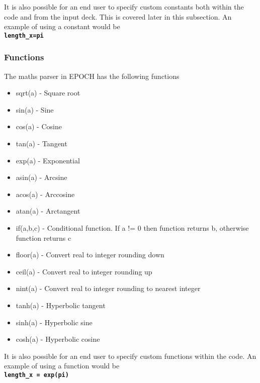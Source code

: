 \documentclass[12pt]{article}
\newcommand{\inlinecode}[1]{{\color{warwickred} \bf\texttt{#1}}}
\newcommand{\EPOCH}{{\color{warwickdark}\fontfamily{phv}\selectfont EPOCH} }
\begin{document}
It is also possible for an end user to specify custom constants both within
the code and from the input deck. This is covered later in this subsection. An
example of using a constant would be\\
\inlinecode{length\_x=pi}\\

\subsubsection{Functions}
The maths parser in \EPOCH has the following functions
\begin{itemize}
\item sqrt(a) - Square root
\item sin(a) - Sine
\item cos(a) - Cosine
\item tan(a) - Tangent
\item exp(a) - Exponential
\item asin(a) - Arcsine
\item acos(a) - Arccosine
\item atan(a) - Arctangent
\item if(a,b,c) - Conditional function. If a != 0 then function returns b,
  otherwise function returns c
\item floor(a) - Convert real to integer rounding down
\item ceil(a) - Convert real to integer rounding up
\item nint(a) - Convert real to integer rounding to nearest integer
\item tanh(a) - Hyperbolic tangent
\item sinh(a) - Hyperbolic sine
\item cosh(a) - Hyperbolic cosine
\end{itemize}

It is also possible for an end user to specify custom functions within the
code. An example of using a function would be\\
\inlinecode{length\_x = exp(pi)}\\
\end{document}
